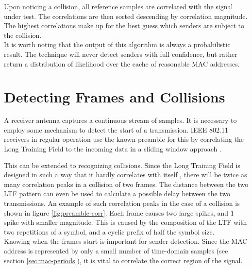 Upon noticing a collision, all reference samples are correlated with the signal under test. The correlations are then sorted descending by correlation magnitude. The highest correlations make up for the best guess which senders are subject to the collision.\\

It is worth noting that the output of this algorithm is always a probabilistic result. The technique will never detect senders with full confidence, but rather return a distribution of likelihood over the cache of reasonable MAC addresses.



\section{Detecting Frames and Collisions}\label{sec:preamble-corr}

A receiver antenna captures a continuous stream of samples. It is necessary to employ some mechanism to detect the start of a transmission. IEEE 802.11 receivers in regular operation use the known preamble for this by correlating the Long Training Field to the incoming data in a sliding window approach \cite{NEEDED}.

This can be extended to recognizing collisions. Since the Long Training Field is designed in such a way that it hardly correlates with itself \cite{NEEDED}, there will be twice as many correlation peaks in a collision of two frames. The distance between the two LTF pattern can even be used to calculate a possible delay between the two transmissions. An example of such correlation peaks in the case of a collision is shown in figure \ref{fig:preamble-corr}. Each frame causes two large spikes, and 1 spike with smaller magnitude. This is caused by the composition of the LTF with two repetitions of a symbol, and a cyclic prefix of half the symbol size.\\

Knowing when the frames start is important for sender detection. Since the MAC address is represented by only a small number of time-domain samples (see section \ref{sec:mac-periods}), it is vital to correlate the correct region of the signal.

